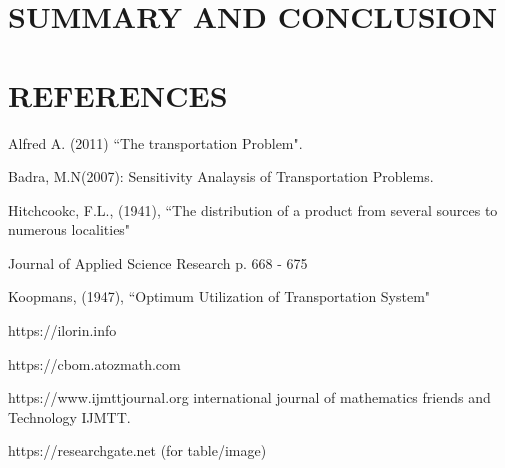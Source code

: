 \documentclass[12pt]{report}
\begin{document}
	\chapter{SUMMARY AND CONCLUSION}
	

	
	\chapter*{REFERENCES}
	
	\begin{description}
		\item Alfred A. (2011) ``The transportation Problem".
		\item Badra, M.N(2007): Sensitivity Analaysis of Transportation Problems.
		\item Hitchcookc, F.L., (1941), ``The distribution of a product from several sources to numerous localities"
		\item Journal of Applied Science Research p. 668 - 675
		\item Koopmans, (1947), ``Optimum Utilization of Transportation System"
		\item https://ilorin.info
		\item https://cbom.atozmath.com
		\item https://www.ijmttjournal.org international journal of mathematics friends and Technology IJMTT.
		\item https://researchgate.net (for table/image)
	\end{description}
	
	
	
	
	
	
	
	
	
	
	
	
	
	
	
	
	
	
	
	
	
	
	
	
	
	
	
	
	
	
	
	
	
	
	
	
	
	
	
	
	
	
	
	
\end{document}
